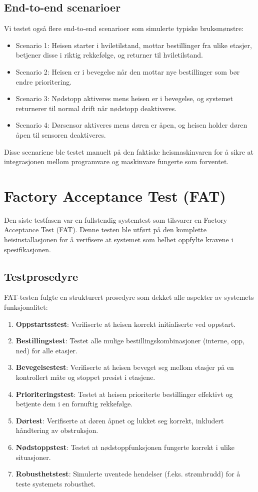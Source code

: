\subsection{End-to-end scenarioer}
Vi testet også flere end-to-end scenarioer som simulerte typiske bruksmønstre:

\begin{itemize}
    \item Scenario 1: Heisen starter i hviletilstand, mottar bestillinger fra ulike etasjer, betjener disse i riktig rekkefølge, og returner til hviletilstand.
    \item Scenario 2: Heisen er i bevegelse når den mottar nye bestillinger som bør endre prioritering.
    \item Scenario 3: Nødstopp aktiveres mens heisen er i bevegelse, og systemet returnerer til normal drift når nødstopp deaktiveres.
    \item Scenario 4: Dørsensor aktiveres mens døren er åpen, og heisen holder døren åpen til sensoren deaktiveres.
\end{itemize}

Disse scenariene ble testet manuelt på den faktiske heismaskinvaren for å sikre at integrasjonen mellom programvare og maskinvare fungerte som forventet.

\section{Factory Acceptance Test (FAT)}
Den siste testfasen var en fullstendig systemtest som tilsvarer en Factory Acceptance Test (FAT). Denne testen ble utført på den komplette heisinstallasjonen for å verifisere at systemet som helhet oppfylte kravene i spesifikasjonen.

\subsection{Testprosedyre}
FAT-testen fulgte en strukturert prosedyre som dekket alle aspekter av systemets funksjonalitet:

\begin{enumerate}
    \item \textbf{Oppstartsstest}: Verifiserte at heisen korrekt initialiserte ved oppstart.
    \item \textbf{Bestillingstest}: Testet alle mulige bestillingskombinasjoner (interne, opp, ned) for alle etasjer.
    \item \textbf{Bevegelsestest}: Verifiserte at heisen beveget seg mellom etasjer på en kontrollert måte og stoppet presist i etasjene.
    \item \textbf{Prioriteringstest}: Testet at heisen prioriterte bestillinger effektivt og betjente dem i en fornuftig rekkefølge.
    \item \textbf{Dørtest}: Verifiserte at døren åpnet og lukket seg korrekt, inkludert håndtering av obstruksjon.
    \item \textbf{Nødstoppstest}: Testet at nødstoppfunksjonen fungerte korrekt i ulike situasjoner.
    \item \textbf{Robusthetstest}: Simulerte uventede hendelser (f.eks. strømbrudd) for å teste systemets robusthet.
\end{enumerate}

